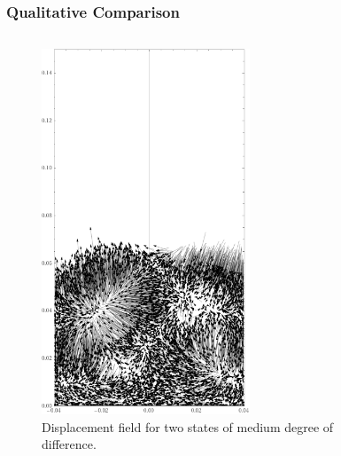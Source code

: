 \documentclass[9pt, english]{beamer}
\begin{document}
\begin{frame}[fragile]
\frametitle{Qualitative Comparison}
\begin{columns}[t]
\begin{column}{0.5\textwidth}
\vspace{-0.65cm}
\begin{figure}
\centering
\includegraphics[width=0.7\textwidth]{fludidized_bed_displacement_1.png}
\caption{Displacement field for two states of medium degree of difference.}
\end{figure}
\end{column}
\begin{column}{0.5\textwidth}
\vspace{-0.65cm}
\begin{figure}
\centering

\end{figure}
\end{column}
\end{columns}
\end{frame}
\end{document}
